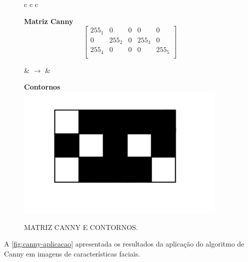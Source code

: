 \begin{figure}[ht]
    \caption{MATRIZ CANNY E CONTORNOS.}
    \label{fig:canny-contornos}
    \centering
    \begin{tabular}{c c c}
        \begin{minipage}{0.4\textwidth}
            \centering
            \textbf{Matriz Canny}\\ [0.2cm]
            \[
            \begin{bmatrix}
                255_1 & 0 & 0 & 0 & 0 \\
                0 & 255_2 & 0 & 255_3 & 0 \\
                255_4 & 0 & 0 & 0 & 255_5 \\
            \end{bmatrix}
            \]
        \end{minipage}
        \hspace{0.5cm}
        
        & $\rightarrow$ &
        \begin{minipage}{0.4\textwidth}
            \centering
            \textbf{Contornos}\\ [0.2cm]
            \includegraphics[width=0.9\textwidth]{fig/contorno_canny.jpeg}
        \end{minipage}
    \end{tabular}
\end{figure}

A \autoref{fig:canny-aplicacao} apresentada os resultados da aplicação do algoritmo de Canny em imagens de características faciais.


